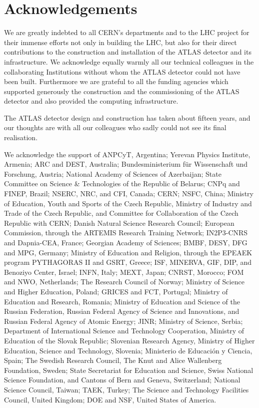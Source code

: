 \documentclass[11pt,a4paper,dvips]{article}
\begin{document}
\section{Acknowledgements}

We are greatly indebted to all CERN's departments and to the LHC project for their immense efforts not only in building the LHC, but also for their direct contributions to the construction and installation of the ATLAS detector and its infrastructure. We acknowledge equally warmly all our technical colleagues in the collaborating Institutions without whom the ATLAS detector could not have been built. Furthermore we are grateful to all the funding agencies which supported generously the construction and the commissioning of the ATLAS detector and also provided the computing infrastructure.

The ATLAS detector design and construction has taken about fifteen years, and our thoughts are with all our colleagues who sadly could not see its final realisation.

We acknowledge the support of ANPCyT, Argentina; Yerevan Physics Institute, Armenia; ARC and DEST, Australia; Bundesministerium f\"ur Wissenschaft und Forschung, Austria; National Academy of Sciences of Azerbaijan; State Committee on Science \& Technologies of the Republic of Belarus; CNPq and FINEP, Brazil; NSERC, NRC, and CFI, Canada; CERN; NSFC, China; Ministry of Education, Youth and Sports of the Czech Republic, Ministry of Industry and Trade of the Czech Republic, and Committee for Collaboration of the Czech Republic with CERN; Danish Natural Science Research Council; European Commission, through the ARTEMIS Research Training Network; IN2P3-CNRS and Dapnia-CEA, France; Georgian Academy of Sciences; BMBF, DESY, DFG and MPG, Germany; Ministry of Education and Religion, through the EPEAEK program PYTHAGORAS II and GSRT, Greece; ISF, MINERVA, GIF, DIP, and Benoziyo Center, Israel; INFN, Italy; MEXT, Japan; CNRST, Morocco; FOM and NWO, Netherlands; The Research Council of Norway; Ministry of Science and Higher Education, Poland; GRICES and FCT, Portugal; Ministry of Education and Research, Romania; Ministry of Education and Science of the Russian Federation, Russian Federal Agency of Science and Innovations, and Russian Federal Agency of Atomic Energy; JINR; Ministry of Science, Serbia; Department of International Science and Technology Cooperation, Ministry of Education of the Slovak Republic; Slovenian Research Agency, Ministry of Higher Education, Science and Technology, Slovenia; Ministerio de Educaci\'{o}n y Ciencia, Spain; The Swedish Research Council, The Knut and Alice Wallenberg Foundation, Sweden; State Secretariat for Education and Science, Swiss National Science Foundation, and Cantons of Bern and Geneva, Switzerland; National Science Council, Taiwan; TAEK, Turkey; The Science and Technology Facilities Council, United Kingdom; DOE and NSF, United States of America. 
\end{document}
